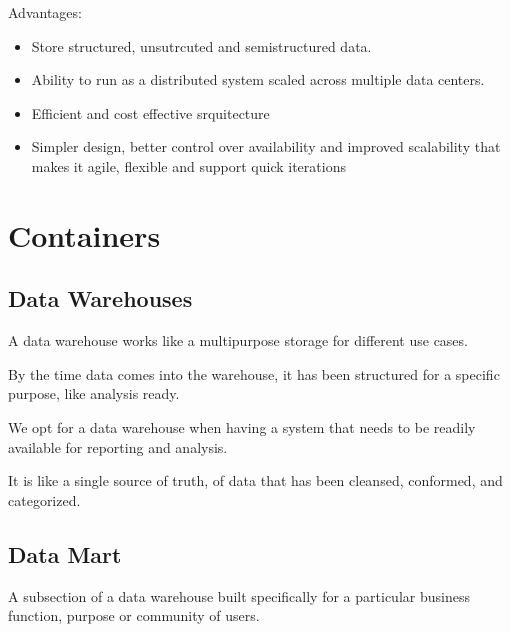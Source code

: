 \documentclass[../../ibm_data_analysis.tex]{subfiles}
\begin{document}
    \begin{obs}
        Advantages:
        \begin{itemize}
            \item Store structured, unsutrcuted and semistructured data.
            \item Ability to run as a distributed system scaled across multiple data centers.
            \item Efficient and cost effective srquitecture
            \item Simpler design, better control over availability and improved scalability that makes it agile, flexible and support quick iterations
        \end{itemize}
    \end{obs}

    \section{Containers}

    \subsection{Data Warehouses}

    \begin{mydef}[Nombre]
        A data warehouse works like a multipurpose storage for different use cases.
    \end{mydef}

    By the time data comes into the warehouse, it has been structured for a specific purpose, like analysis ready.

    \begin{obs}
        We opt for a data warehouse when having a system that needs to be readily available for reporting and analysis.
    \end{obs}

    It is like a single source of truth, of data that has been cleansed, conformed, and categorized.

    \subsection{Data Mart}

    \begin{mydef}[Nombre]
        A subsection of a data warehouse built specifically for a particular business function, purpose or community of users.
    \end{mydef}
\end{document}
